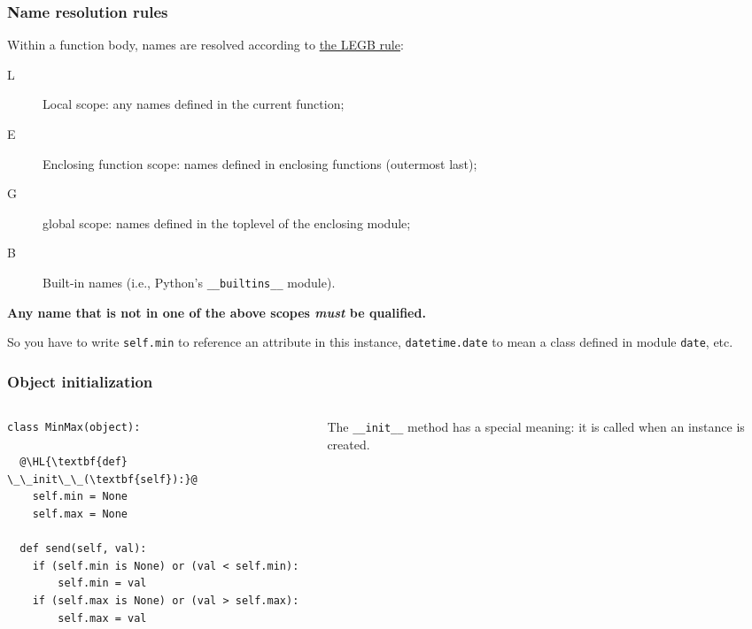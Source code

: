 \documentclass[english,serif,mathserif,xcolor=pdftex,dvipsnames,table]{beamer}
\begin{document}
\begin{frame}[fragile]
  \frametitle{Name resolution rules}
  \small

  Within a function body, names are resolved according to \href{http://stackoverflow.com/questions/291978/short-description-of-python-scoping-rules/292502#292502}{the LEGB rule}:
  \begin{description}
  \item[L] Local scope: any names defined in the current function;
  \item[E] Enclosing function scope: names defined in enclosing
    functions (outermost last);
  \item[G] global scope: names defined in the toplevel of the enclosing module;
  \item[B] Built-in names (i.e., Python's \texttt{\_\_builtins\_\_} module).
  \end{description}

  \+
  \textbf{Any name that is not in one of the above scopes \emph{must}
    be qualified.}

  \+
  So you have to write \texttt{self.min} to reference an attribute in
  this instance, \texttt{datetime.date} to mean a class defined in module
  \texttt{date}, etc.

\end{frame}


\begin{frame}[fragile]
  \frametitle{Object initialization}
  \begin{columns}[t]
    \begin{column}{0.5\textwidth}
\begin{lstlisting}
class MinMax(object):

  @\HL{\textbf{def} \_\_init\_\_(\textbf{self}):}@
    self.min = None
    self.max = None

  def send(self, val):
    if (self.min is None) or (val < self.min):
        self.min = val
    if (self.max is None) or (val > self.max):
        self.max = val
\end{lstlisting}
    \end{column}
    \begin{column}{0.5\textwidth}
      \raggedleft
      The \lstinline|__init__| method has a special
      meaning: it is called when an instance is created.
    \end{column}
  \end{columns}
\end{frame}
\end{document}

